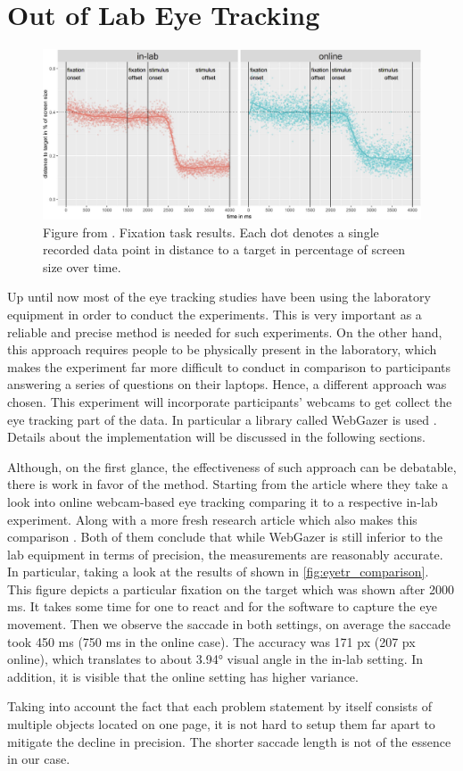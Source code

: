 \section{Out of Lab Eye Tracking} \label{sec:eyetr}
\begin{figure}
    \centering
    \includegraphics[width=1\linewidth]{images/tracker_comparison.png}
    \caption{Figure from \cite{Semmelmann_2018}. Fixation task results. Each dot denotes a single recorded data point in distance to a target in percentage of screen size over time.}
    \label{fig:eyetr_comparison}
\end{figure}
Up until now most of the eye tracking studies have been using the laboratory equipment in order to conduct the experiments. This is very important as a reliable and precise method is needed for such experiments. On the other hand, this approach requires people to be physically present in the laboratory, which makes the experiment far more difficult to conduct in comparison to participants answering a series of questions on their laptops. Hence, a different approach was chosen. This experiment will incorporate participants' webcams to get collect the eye tracking part of the data. In particular a library called WebGazer is used \cite{wegbazer}. Details about the implementation will be discussed in the following sections. 

Although, on the first glance, the effectiveness of such approach can be debatable, there is work in favor of the method. Starting from the article \cite{Semmelmann_2018} where they take a look into online webcam-based eye tracking comparing it to a respective in-lab experiment. Along with a more fresh research article which also makes this comparison \citep{Wisiecka_2022}. Both of them conclude that while WebGazer is still inferior to the lab equipment in terms of precision, the measurements are reasonably accurate. In particular, taking a look at the results of \cite{Semmelmann_2018} shown in \autoref{fig:eyetr_comparison}. This figure depicts a particular fixation on the target which was shown after 2000 ms. It takes some time for one to react and for the software to capture the eye movement. Then we observe the saccade in both settings, on average the saccade took 450 ms (750 ms in the online case). The accuracy was 171 px (207 px online), which translates to about 3.94° visual angle in the in-lab setting. In addition, it is visible that the online setting has higher variance.

Taking into account the fact that each problem statement by itself consists of multiple objects located on one page, it is not hard to setup them far apart to mitigate the decline in precision. The shorter saccade length is not of the essence in our case.
